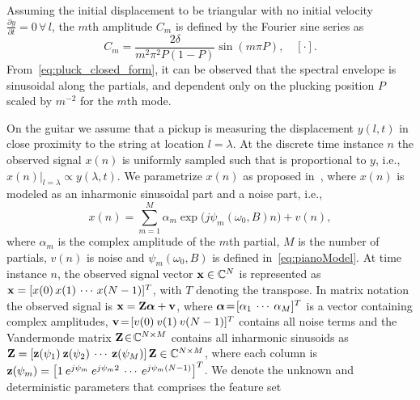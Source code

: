 \documentclass{article}
\begin{document}
\begin{sloppy}
Assuming the initial displacement to be triangular with no initial velocity $\frac{\partial y}{\partial t} = 0 \, \forall\, l$, the $m$th amplitude $C_m$ is defined by the Fourier sine series as~\cite{donkin:acoustics,fletcher:principles_of_vibration_and_sound}
\begin{equation}\label{eq:pluck_closed_form}
    C_m = \frac{2\delta}{m^2\pi^2P(1-P)}\sin(m\pi P), \quad [\cdot].
\end{equation}
From~\eqref{eq:pluck_closed_form}, it can be observed that the spectral envelope is sinusoidal along the partials, and dependent only on the plucking position $P$ scaled by $m^{-2}$ for the $m$th mode.

On the guitar we assume that a pickup is measuring the displacement $y(l,t)$ in close proximity to the string at location $l\!=\!\lambda$. At the discrete time instance $n$ the observed signal $x(n)$ is uniformly sampled such that is proportional to $y$, i.e.,
     $x(n)  \vert_{l=\lambda} \propto y(\lambda, t).$
We parametrize $x(n)$ as proposed in~\cite{hjerrild::icassp19}, where $x(n)$ is modeled as an inharmonic sinusoidal part and a noise part, i.e.,  
\begin{equation}\label{eq:sigmod1}
  x(n)\! =  \!\sum\limits_{m=1}^{M}\!\! \alpha_{m} \exp\big({j\psi_m(\omega_0,B) n}\big)+v(n),
\end{equation}
where $\alpha_{m}$ is the complex amplitude of the $m$th partial, $M$ is the number of partials, $v(n)$ is noise and $\psi_m(\omega_0,B)$ is defined in~\eqref{eq:pianoModel}.
%
 At time instance $n$, the observed signal vector $\mathbf x \in \mathbb{C}^N$ is represented as $\mathbf x = [x(0) \, x(1) \, \cdots \, x(N-1)]^T$, with $T$ denoting the transpose. 
In matrix notation the observed signal is
$  \mathbf x = \mathbf{Z} \text{\boldmath$\alpha$} + \mathbf v$, 
where $\text{\boldmath$\alpha$}\!=\! [\alpha_1 \: \cdots \: \alpha_M]^T$ is a vector containing complex amplitudes, $\mathbf v\! =\! [v(0) \: v(1) \: v(N-1)]^T$ contains all noise terms and the Vandermonde matrix $\mathbf{Z}\! \in\! \mathbb{C}^{N\times M}$ contains all inharmonic sinusoids as $\mathbf{Z} = \left[ \mathbf z(\psi_1) \: \mathbf z(\psi_2) \: \cdots \: \mathbf z(\psi_M)\right] \mathbf{Z} \in \mathbb{C}^{N\times M}$, where each column is $\mathbf z(\psi_m) = \left[ 1 \: e^{j\psi_m} \: e^{j\psi_m2} \: \cdots \: e^{j\psi_m(N-1)} \right]^{T}$.
We denote the unknown and deterministic parameters that comprises the feature set 

\end{sloppy}
\end{document}

